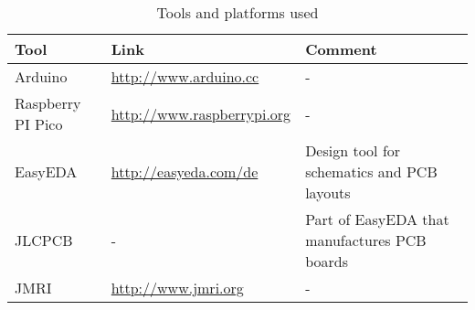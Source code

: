 \begin{table}[h!]
\centering
\begin{tabularx}{\textwidth}{lXl}
\toprule
\textbf{Tool} & \textbf{Link} & \textbf{Comment} \\
\midrule
Arduino & \url{http://www.arduino.cc} & - \\
\midrule
Raspberry PI Pico & \url{http://www.raspberrypi.org} & - \\
\midrule
EasyEDA & \url{http://easyeda.com/de} & Design tool for schematics and PCB layouts \\
\midrule
JLCPCB & - & Part of EasyEDA that manufactures PCB boards \\
\midrule
JMRI & \url{http://www.jmri.org} & - \\
\bottomrule
\end{tabularx}
\caption{Tools and platforms used}
\label{tab:tools}
\end{table}


